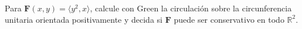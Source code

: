 Para $\mathbf{F}(x,y)=\langle y^2,x\rangle$, calcule con Green la circulación sobre la circunferencia unitaria orientada positivamente y decida si $\mathbf{F}$ puede ser conservativo en todo $\mathbb R^2$.
